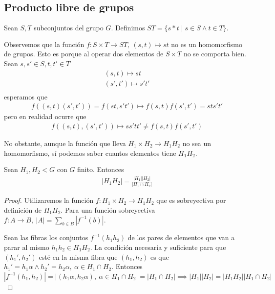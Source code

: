 \documentclass{book}
\theoremstyle{definition}
\theoremstyle{remark}
\begin{document}
\subsection{Producto libre de grupos}

\begin{dfn}
	\label{dfn:productolibre}
	Sean $S,T$ subconjuntos del grupo $G$. Definimos $ST = \{s\ast t \mid s \in S \land t \in T\}$.
\end{dfn}

Observemos que la función $f: S \times T \to ST,\ (s,t) \mapsto st$ no es un homomorfismo de grupos. Esto es porque al operar dos elementos de $S \times T$ no se comporta bien. Sean $s,s'\in S, t,t'\in T$
\begin{align*}
(s,t) \mapsto st \\
(s',t') \mapsto s't' \\
\end{align*}
esperamos que 
\begin{align*}
	f((s,t)(s',t')) = f(st, s't') \mapsto f(s,t)f(s',t') = sts't'
\end{align*}
pero en realidad ocurre que
\begin{align*}
f((s,t),(s',t')) \mapsto ss'tt' \neq f(s,t)f(s',t')
\end{align*}

No obstante, aunque la función que lleva $H_1 \times H_2 \to H_1 H_2$ no sea un homomorfismo, sí podemos saber cuantos elementos tiene $H_1H_2$.

\begin{thm}
	\label{thm:cardinalidadproductolibre}
	Sean $H_1, H_2 < G$ con $G$ finito. Entonces
	\begin{align}
	|H_1H_2| = \frac{|H_1||H_2|}{|H_1 \cap H_2|}
	\end{align}
\end{thm}

\begin{proof}
	Utilizaremos la función $f:H_1 \times H_2 \to H_1 H_2$ que es sobreyectiva por definición de $H_1 H_2$. Para una función sobreyectiva $f: A \to B,\ |A| = \sum_{b \in B} |f^{-1}(b)|$.
	
	
	Sean las fibras los conjuntos $f^{-1}(h_1h_2)$ de los pares de elementos que van a parar al mismo $h_1h_2 \in H_1 H_2$. La condición necesaria y suficiente para que $(h_1', h_2')$ esté en la misma fibra que $(h_1, h_2)$ es que $h_1' = h_1 \alpha \land h_2' = h_2 \alpha,\ \alpha \in H_1 \cap H_2$. Entonces $|f^{-1}(h_1, h_2)| = | (h_1 \alpha, h_2\alpha),\ \alpha \in H_1\cap H_2| = |H_1 \cap H_2| \implies |H_1||H_2| = |H_1 H_2| |H_1 \cap H_2|$ 
\end{proof}
\end{document}
